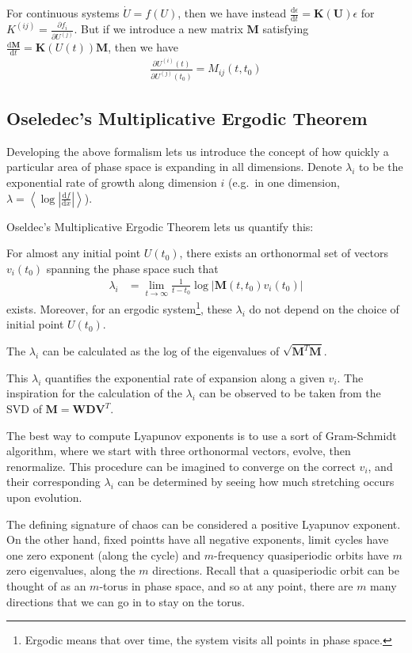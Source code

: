 \documentclass[10pt]{article}
\newcommand{\rd}[2]{\frac{\mathrm{d}#1}{\mathrm{d}#2}}
\newcommand{\pd}[2]{\frac{\partial#1}{\partial#2}}
\newcommand{\abs}[1]{\left|#1\right|}
\newcommand{\expvalue}[1]{\left<#1\right>}
\begin{document}
For continuous systems $\dot{U} = f(U)$, then we have instead $\rd{\epsilon}{t}
= \mathbf{K(U)}\epsilon$ for $K^{(ij)} = \pd{f_i}{U^{(j)}}$. But if we introduce
a new matrix $\mathbf{M}$ satisfying
$\rd{\mathbf{M}}{t} = \mathbf{K}(U(t))\mathbf{M}$, then we have
\begin{align}
    \pd{U^{(i)}(t)}{U^{(j)}(t_0)} = M_{ij}(t,t_0)
\end{align}

\subsection{Oseledec's Multiplicative Ergodic Theorem}

Developing the above formalism lets us introduce the concept of how quickly a
particular area of phase space is expanding in all dimensions. Denote
$\lambda_i$ to be the exponential rate of growth along dimension $i$ (e.g.\ in
one dimension, $\lambda = \expvalue{\log\abs{\rd{f}{x}}}$).

Oseldec's Multiplicative Ergodic Theorem lets us quantify this:
\begin{center}
    For almost any initial point $U(t_0)$, there exists an orthonormal set of
    vectors $v_i(t_0)$ spanning the phase space such that
    \begin{align}
        \lambda_i &= \lim_{t \to\infty} \frac{1}{t-t_0}
            \log\abs{\mathbf{M}(t, t_0) v_i(t_0)}
    \end{align}
    exists. Moreover, for an ergodic system\footnote{Ergodic means that over
    time, the system visits all points in phase space.}, these $\lambda_i$ do
    not depend on the choice of initial point $U(t_0)$.

    The $\lambda_i$ can be calculated as the log of the eigenvalues of
    $\sqrt{\mathbf{M}^T\mathbf{M}}$.
\end{center}

This $\lambda_i$ quantifies the exponential rate of expansion along a given
$v_i$. The inspiration for the calculation of the $\lambda_i$ can be observed to
be taken from the SVD of $\mathbf{M} = \mathbf{WDV}^T$.

The best way to compute Lyapunov exponents is to use a sort of Gram-Schmidt
algorithm, where we start with three orthonormal vectors, evolve, then
renormalize. This procedure can be imagined to converge on the correct $v_i$,
and their corresponding $\lambda_i$ can be determined by seeing how much
stretching occurs upon evolution.

The defining signature of chaos can be considered a positive Lyapunov
exponent. On the other hand, fixed pointts have all negative exponents, limit
cycles have one zero exponent (along the cycle) and $m$-frequency quasiperiodic
orbits have $m$ zero eigenvalues, along the $m$ directions. Recall that a
quasiperiodic orbit can be thought of as an $m$-torus in phase space, and so at
any point, there are $m$ many directions that we can go in to stay on the torus.
\end{document}
